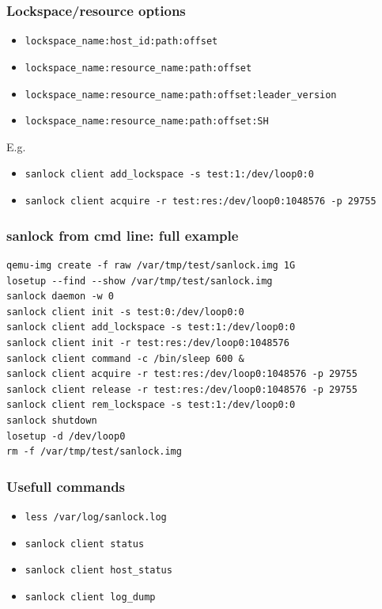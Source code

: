 \documentclass[10pt,utf8]{beamer}
\begin{document}
\begin{frame}
    \frametitle{Lockspace/resource options}
    \begin{itemize}
        \item \texttt{lockspace\_name:host\_id:path:offset}
        \item \texttt{lockspace\_name:resource\_name:path:offset}
        \item \texttt{lockspace\_name:resource\_name:path:offset:leader\_version}
        \item \texttt{lockspace\_name:resource\_name:path:offset:SH}
    \end{itemize}
    
    \vspace{0.5cm}
    
    E.g.
    \begin{itemize}
        \item \texttt{sanlock client add\_lockspace -s test:1:/dev/loop0:0}
        \item \texttt{sanlock client acquire -r test:res:/dev/loop0:1048576 -p 29755}
    \end{itemize}
\end{frame}

\begin{frame}[fragile]
    \frametitle{sanlock from cmd line: full example}
    \begin{lstlisting}[style=bash]
qemu-img create -f raw /var/tmp/test/sanlock.img 1G
losetup --find --show /var/tmp/test/sanlock.img
sanlock daemon -w 0
sanlock client init -s test:0:/dev/loop0:0
sanlock client add_lockspace -s test:1:/dev/loop0:0
sanlock client init -r test:res:/dev/loop0:1048576
sanlock client command -c /bin/sleep 600 &
sanlock client acquire -r test:res:/dev/loop0:1048576 -p 29755
sanlock client release -r test:res:/dev/loop0:1048576 -p 29755
sanlock client rem_lockspace -s test:1:/dev/loop0:0
sanlock shutdown
losetup -d /dev/loop0
rm -f /var/tmp/test/sanlock.img 
    \end{lstlisting}
\end{frame}

\begin{frame}
    \frametitle{Usefull commands}
    \begin{itemize}
        \item \texttt{less /var/log/sanlock.log}
        \item \texttt{sanlock client status}
        \item \texttt{sanlock client host\_status}
        \item \texttt{sanlock client log\_dump}
    \end{itemize}
\end{frame}
\end{document}
